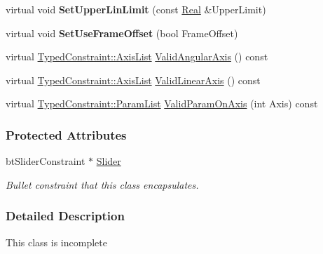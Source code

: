 \begin{DoxyCompactItemize}
\item 
\hypertarget{classMezzanine_1_1SliderConstraint_a1a9b1c823c41cfa2bf27134a9cb86375}{
virtual void {\bfseries SetUpperLinLimit} (const \hyperlink{namespaceMezzanine_a726731b1a7df72bf3583e4a97282c6f6}{Real} \&UpperLimit)}
\label{classMezzanine_1_1SliderConstraint_a1a9b1c823c41cfa2bf27134a9cb86375}

\item 
\hypertarget{classMezzanine_1_1SliderConstraint_a5402cffa565acf077aff46a1e2556bd9}{
virtual void {\bfseries SetUseFrameOffset} (bool FrameOffset)}
\label{classMezzanine_1_1SliderConstraint_a5402cffa565acf077aff46a1e2556bd9}

\item 
virtual \hyperlink{classMezzanine_1_1TypedConstraint_ac6b8e0839cd686f73d0c9e9ad5db47a4}{TypedConstraint::AxisList} \hyperlink{classMezzanine_1_1SliderConstraint_ac96a0956a0cb82b4b37d0da3a9d348fa}{ValidAngularAxis} () const 
\item 
virtual \hyperlink{classMezzanine_1_1TypedConstraint_ac6b8e0839cd686f73d0c9e9ad5db47a4}{TypedConstraint::AxisList} \hyperlink{classMezzanine_1_1SliderConstraint_ac238c09e330b22833bd666a73b93f8d0}{ValidLinearAxis} () const 
\item 
virtual \hyperlink{classMezzanine_1_1TypedConstraint_abd499db29c9e9755e9bb547d29eaa49a}{TypedConstraint::ParamList} \hyperlink{classMezzanine_1_1SliderConstraint_a6883d8b39517a5a96c099b1d1b441d95}{ValidParamOnAxis} (int Axis) const 
\end{DoxyCompactItemize}
\subsubsection*{Protected Attributes}
\begin{DoxyCompactItemize}
\item 
\hypertarget{classMezzanine_1_1SliderConstraint_ad0efdaf32b9de3085d2fef36020e0cb2}{
btSliderConstraint $\ast$ \hyperlink{classMezzanine_1_1SliderConstraint_ad0efdaf32b9de3085d2fef36020e0cb2}{Slider}}
\label{classMezzanine_1_1SliderConstraint_ad0efdaf32b9de3085d2fef36020e0cb2}

\begin{DoxyCompactList}\small\item\em Bullet constraint that this class encapsulates. \item\end{DoxyCompactList}\end{DoxyCompactItemize}


\subsubsection{Detailed Description}
This class is incomplete 

